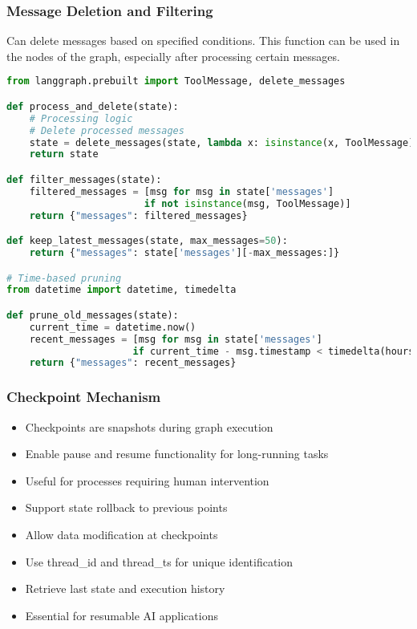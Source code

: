 \begin{frame}[fragile]\frametitle{Message Deletion and Filtering}

Can delete messages based on specified conditions. This function can be used in the nodes of the graph, especially after processing certain messages.

      \begin{lstlisting}[language=Python, basicstyle=\tiny]
from langgraph.prebuilt import ToolMessage, delete_messages

def process_and_delete(state):
    # Processing logic
    # Delete processed messages
    state = delete_messages(state, lambda x: isinstance(x, ToolMessage))
    return state

def filter_messages(state):
    filtered_messages = [msg for msg in state['messages'] 
                        if not isinstance(msg, ToolMessage)]
    return {"messages": filtered_messages}

def keep_latest_messages(state, max_messages=50):
    return {"messages": state['messages'][-max_messages:]}

# Time-based pruning
from datetime import datetime, timedelta

def prune_old_messages(state):
    current_time = datetime.now()
    recent_messages = [msg for msg in state['messages'] 
                      if current_time - msg.timestamp < timedelta(hours=1)]
    return {"messages": recent_messages}
      \end{lstlisting}
\end{frame}

\begin{frame}[fragile]\frametitle{Checkpoint Mechanism}
      \begin{itemize}
        \item Checkpoints are snapshots during graph execution
        \item Enable pause and resume functionality for long-running tasks
        \item Useful for processes requiring human intervention
        \item Support state rollback to previous points
        \item Allow data modification at checkpoints
        \item Use thread\_id and thread\_ts for unique identification
        \item Retrieve last state and execution history
        \item Essential for resumable AI applications
      \end{itemize}
\end{frame}

